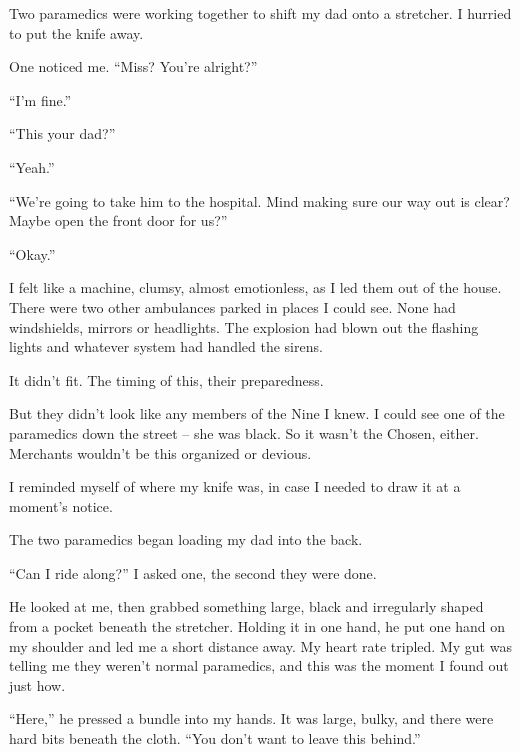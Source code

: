 Two paramedics were working together to shift my dad onto a stretcher.  I hurried to put the knife away.



One noticed me.  ``Miss?  You're alright?''



``I'm fine.''



``This your dad?''



``Yeah.''



``We're going to take him to the hospital.  Mind making sure our way out is clear?  Maybe open the front door for us?''



``Okay.''



I felt like a machine, clumsy, almost emotionless, as I led them out of the house.  There were two other ambulances parked in places I could see.  None had windshields, mirrors or headlights.  The explosion had blown out the flashing lights and whatever system had handled the sirens.



It didn't fit.  The timing of this, their preparedness.



But they didn't look like any members of the Nine I knew.  I could see one of the paramedics down the street – she was black.  So it wasn't the Chosen, either.  Merchants wouldn't be this organized or devious.



I reminded myself of where my knife was, in case I needed to draw it at a moment's notice.



The two paramedics began loading my dad into the back.



``Can I ride along?'' I asked one, the second they were done.



He looked at me, then grabbed something large, black and irregularly shaped from a pocket beneath the stretcher.  Holding it in one hand, he put one hand on my shoulder and led me a short distance away.  My heart rate tripled.  My gut was telling me they weren't normal paramedics, and this was the moment I found out just how.



``Here,'' he pressed a bundle into my hands.  It was large, bulky, and there were hard bits beneath the cloth.  ``You don't want to leave this behind.''



